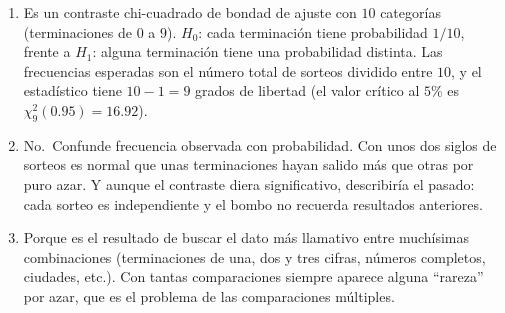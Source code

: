 \documentclass[
  spanish,
  a4paper,
]{scrreport}
\theoremstyle{definition}
\theoremstyle{remark}
\begin{document}
\begin{tcolorbox}[enhanced jigsaw, arc=.35mm, bottomrule=.15mm, bottomtitle=1mm, breakable, colback=white, colbacktitle=quarto-callout-tip-color!10!white, colframe=quarto-callout-tip-color-frame, coltitle=black, left=2mm, leftrule=.75mm, opacityback=0, opacitybacktitle=0.6, rightrule=.15mm, title=\textcolor{quarto-callout-tip-color}{\faLightbulb}\hspace{0.5em}{Solución}, titlerule=0mm, toprule=.15mm, toptitle=1mm]

\begin{enumerate}
\def\labelenumi{\alph{enumi}.}
\item
  Es un contraste chi-cuadrado de bondad de ajuste con \(10\) categorías
  (terminaciones de \(0\) a \(9\)). \(H_0\): cada terminación tiene
  probabilidad \(1/10\), frente a \(H_1\): alguna terminación tiene una
  probabilidad distinta. Las frecuencias esperadas son el número total
  de sorteos dividido entre \(10\), y el estadístico tiene \(10-1=9\)
  grados de libertad (el valor crítico al \(5\)\% es
  \(\chi^2_{9}(0.95)=16.92\)).
\item
  No.~Confunde frecuencia observada con probabilidad. Con unos dos
  siglos de sorteos es normal que unas terminaciones hayan salido más
  que otras por puro azar. Y aunque el contraste diera significativo,
  describiría el pasado: cada sorteo es independiente y el bombo no
  recuerda resultados anteriores.
\item
  Porque es el resultado de buscar el dato más llamativo entre
  muchísimas combinaciones (terminaciones de una, dos y tres cifras,
  números completos, ciudades, etc.). Con tantas comparaciones siempre
  aparece alguna ``rareza'' por azar, que es el problema de las
  comparaciones múltiples.
\end{enumerate}

\end{tcolorbox}
\end{document}
